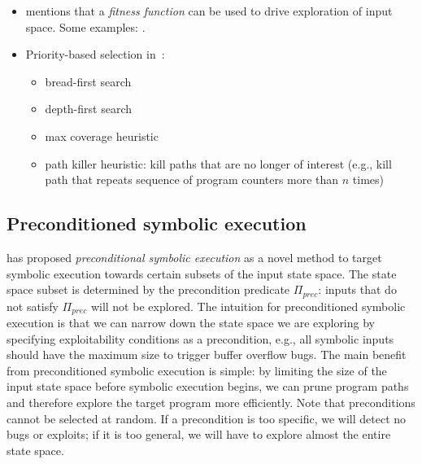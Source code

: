 \begin{itemize}
  \item \cite{CS-CACM13} mentions that a {\em fitness function} can be used to drive exploration of input space. Some examples: \cite{BHH-ASE11,LMH-JSS10}.

  \item Priority-based selection in~\cite{CKC-TOCS12}:
    \begin{itemize}
      \item bread-first search
      \item depth-first search
      \item max coverage heuristic
      \item path killer heuristic: kill paths that are no longer of interest (e.g., kill path that repeats sequence of program counters more than $n$ times)
    \end{itemize}

\end{itemize}


\subsection{Preconditioned symbolic execution}
\label{precontioned-symbolic-execution}

\cite{AEG-NDSS11} has proposed {\em preconditional symbolic execution} as a novel method to target symbolic execution towards certain subsets of the input state space. The state space subset is determined by the precondition predicate $\Pi_{prec}$: inputs that do not satisfy $\Pi_{prec}$ will not be explored. The intuition for preconditioned symbolic execution is that we can narrow down the state space we are exploring by specifying exploitability conditions as a precondition, e.g., all symbolic inputs should have the maximum size to trigger buffer overflow bugs. The main benefit from preconditioned symbolic execution is simple: by limiting the size of the input state space before symbolic execution begins, we can prune program paths and therefore explore the target program more efficiently.
Note that preconditions cannot be selected at random. If a precondition is too specific, we will detect no bugs or exploits; if it is too general, we will have to explore almost the entire state space. %

